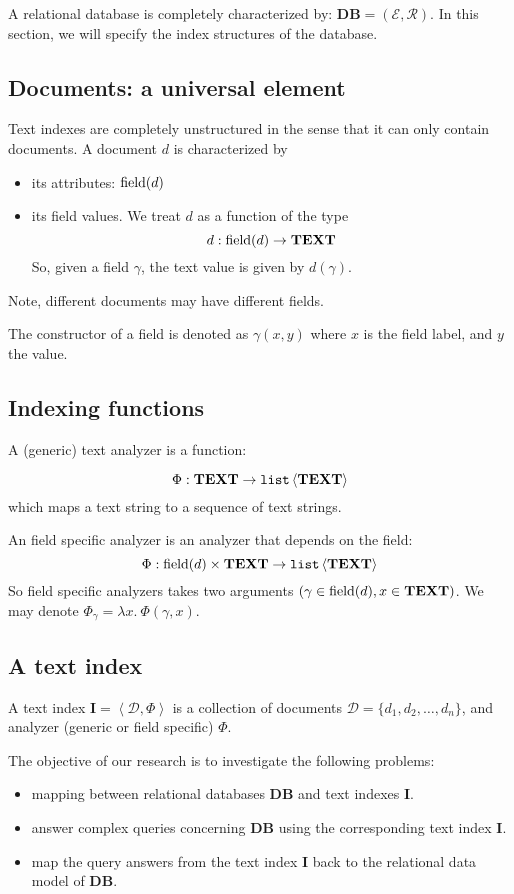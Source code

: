 \documentclass{article}
\begin{document}
A relational database is completely characterized by:
$\mathbf{DB} = (\mathcal{E}, \mathcal{R})$.  In this section, we will specify
the index structures of the database.

\subsection{Documents: a universal element}

Text indexes are completely unstructured in the sense that it can only contain
documents.  A document $d$ is characterized by
\begin{itemize}
\item its attributes: $\operatorname{field}(d)$
\item its field values.  We treat $d$ as a function of the type
$$d:\operatorname{field}(d)\to\mathbf{TEXT}$$
So, given a field $\gamma$, the text value is given by $d(\gamma)$.
\end{itemize}

Note, different documents may have different fields.

The constructor of a field is denoted as $\gamma(x, y)$ where $x$ is the field
label, and $y$ the value.

\subsection{Indexing functions}

A (generic) text analyzer is a function:

$$\Phi:\mathbf{TEXT} \to \mathtt{list}\left<\mathbf{TEXT}\right>$$
which maps a text string to a sequence of text strings.

An field specific analyzer is an analyzer that depends on the field:
$$\Phi : \operatorname{field}(d)\times\mathbf{TEXT} \to\mathtt{list}\left<\mathbf{TEXT}\right>$$
So field specific analyzers takes two arguments $(\gamma\in\operatorname{field}(d),
x\in\mathbf{TEXT})$.  We may denote $\Phi_\gamma = \lambda x.\ \Phi(\gamma,x)$.

\subsection{A text index}
A text index $\mathbf{I} = \left<\mathcal{D}, \Phi\right>$ is a collection of
documents $\mathcal{D} = \{d_1, d_2, \dots, d_n\}$, and analyzer (generic or
field specific) $\Phi$.

The objective of our research is to investigate the following problems:
\begin{itemize}
\item mapping between relational databases $\mathbf{DB}$ and text indexes
$\mathbf{I}$.
\item answer complex queries concerning $\mathbf{DB}$ using the corresponding
text index $\mathbf{I}$.
\item map the query answers from the text index $\mathbf{I}$ back to the
relational data model of $\mathbf{DB}$.
\end{itemize}
\end{document}
